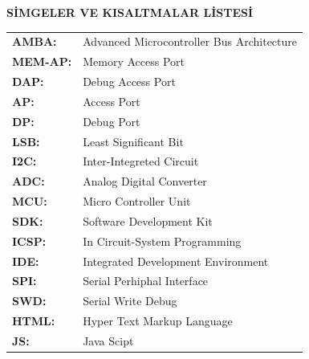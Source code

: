 \documentclass[]{esogu}			%
\makeatletter
\newcommand{\AtBeginShipoutClear}{\gdef\AtBegShi@Hook{}}
\makeatother
\begin{document}
\tableofcontents*
\AtBeginShipoutClear
\newpage
{}
\listoffigures
\AtBeginShipoutClear
\newpage
{}
\listoftables
\AtBeginShipoutClear
\clearpage

\clearpage
\textbf{SİMGELER VE KISALTMALAR LİSTESİ}

\begin{table}[h]
\begin{tabular}{l l}
	\textbf{AMBA:	} & Advanced Microcontroller Bus Architecture \\
	\textbf{MEM-AP:	} & Memory Access Port \\
	\textbf{DAP:	} & Debug Access Port \\
	\textbf{AP:	} & Access Port \\
	\textbf{DP:	} & Debug Port \\
	\textbf{LSB:	} & Least Significant Bit \\
	\textbf{I2C:	} & Inter-Integreted Circuit \\
	\textbf{ADC:	} & Analog Digital Converter \\
	\textbf{MCU:	} & Micro Controller Unit \\
	\textbf{SDK:	} & Software Development Kit \\
	\textbf{ICSP:	} & In Circuit-System Programming \\
	\textbf{IDE:	} & Integrated Development Environment \\
	\textbf{SPI:	} & Serial Perhiphal Interface \\
	\textbf{SWD:	} & Serial Write Debug \\
	\textbf{HTML:	} & Hyper Text Markup Language \\
	\textbf{JS:	} & Java Scipt \\
\end{tabular}
\end{table}
\clearpage
\end{document}
